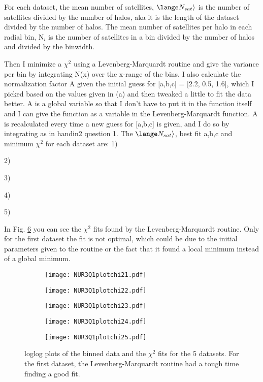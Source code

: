 For each dataset, the mean number of satellites, $\lange N_{sat} \rangle$ is the number of satellites divided by
the number of halos, aka it is the length of the dataset divided by the number of halos. 
The mean number of satellites per halo in each radial bin, N$_i$ is the number of satellites in a bin divided by
the number of halos and divided by the binwidth. 

Then I minimize a $\chi^2$ using a Levenberg-Marquardt routine and give the variance per bin by integrating N(x) 
over the x-range of the bins. I also calculate the normalization factor A given the initial guess for [a,b,c] =
[2.2, 0.5, 1.6], which I picked based on the values given in (a) and then tweaked a little to fit the data better.
A is a global variable so that I don't have to put it in the function itself and I can give the function as a variable
in the Levenberg-Marquardt function. A is recalculated every time a new guess for [a,b,c] is given, and I do so
by integrating as in handin2 question 1. 
The $\lange N_{sat} \rangle$, best fit a,b,c and minimum $\chi^2$ for each dataset are: 1)

2)

3)

4)

5)


In Fig. \ref{fig:fig2} you can see the $\chi^2$ fits found by the Levenberg-Marquardt routine. Only for the first dataset the fit is not optimal, which could be due to the initial parameters given to the routine or the fact that it found a local minimum instead of a global minimum. 

\begin{figure}[ht]
    \begin{subfigure}{.49\textwidth}
       \centering
    \texttt{[image: NUR3Q1plotchi21.pdf]}
    \centering
    \subcaption{}
    \label{}
    \end{subfigure}
    \hfill
    \begin{subfigure}{.49\textwidth}
       \centering
    \texttt{[image: NUR3Q1plotchi22.pdf]}
    \centering
    \subcaption{}
    \label{}
    \end{subfigure}
     \begin{subfigure}{.49\textwidth}
       \centering
    \texttt{[image: NUR3Q1plotchi23.pdf]}
    \centering
    \subcaption{}
    \label{}
    \end{subfigure}
     \begin{subfigure}{.49\textwidth}
       \centering
    \texttt{[image: NUR3Q1plotchi24.pdf]}
    \centering
    \subcaption{}
    \label{}
    \end{subfigure}
     \begin{subfigure}{.49\textwidth}
       \centering
    \texttt{[image: NUR3Q1plotchi25.pdf]}
    \centering
    \subcaption{}
    \label{}
    \end{subfigure}
    \caption{loglog plots of the binned data and the $\chi^2$ fits for the 5 datasets. For the first dataset, the Levenberg-Marquardt routine had a tough time finding a good fit.}
    \label{fig:fig2}
\end{figure}


